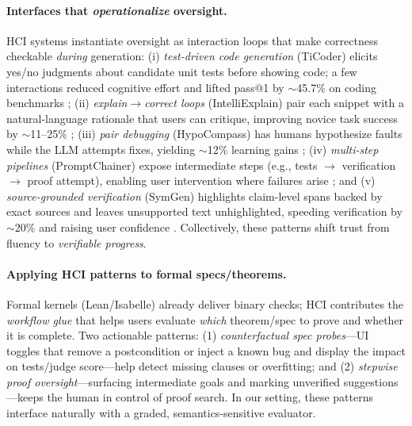\paragraph{Interfaces that \emph{operationalize} oversight.}
HCI systems instantiate oversight as interaction loops that make correctness checkable \emph{during} generation: (i) \emph{test-driven code generation} (TiCoder) elicits yes/no judgments about candidate unit tests before showing code; a few interactions reduced cognitive effort and lifted pass@1 by $\sim$45.7\% on coding benchmarks \citep{naik2024ticoder}; (ii) \emph{explain$\rightarrow$correct loops} (IntelliExplain) pair each snippet with a natural-language rationale that users can critique, improving novice task success by $\sim$11--25\% \citep{yan2024intelliexplain}; (iii) \emph{pair debugging} (HypoCompass) has humans hypothesize faults while the LLM attempts fixes, yielding $\sim$12\% learning gains \citep{ma2024hypocompass}; (iv) \emph{multi-step pipelines} (PromptChainer) expose intermediate steps (e.g., tests $\rightarrow$ verification $\rightarrow$ proof attempt), enabling user intervention where failures arise \citep{wu2022promptchainer}; and (v) \emph{source-grounded verification} (SymGen) highlights claim-level spans backed by exact sources and leaves unsupported text unhighlighted, speeding verification by $\sim$20\% and raising user confidence \citep{shen2024symgen}. Collectively, these patterns shift trust from fluency to \emph{verifiable progress}.%

\paragraph{Applying HCI patterns to formal specs/theorems.}
Formal kernels (Lean/Isabelle) already deliver binary checks; HCI contributes the \emph{workflow glue} that helps users evaluate \emph{which} theorem/spec to prove and whether it is complete. Two actionable patterns: (1) \emph{counterfactual spec probes}---UI toggles that remove a postcondition or inject a known bug and display the impact on tests/judge score---help detect missing clauses or overfitting; and (2) \emph{stepwise proof oversight}---surfacing intermediate goals and marking unverified suggestions---keeps the human in control of proof search. In our setting, these patterns interface naturally with a graded, semantics-sensitive evaluator.%

